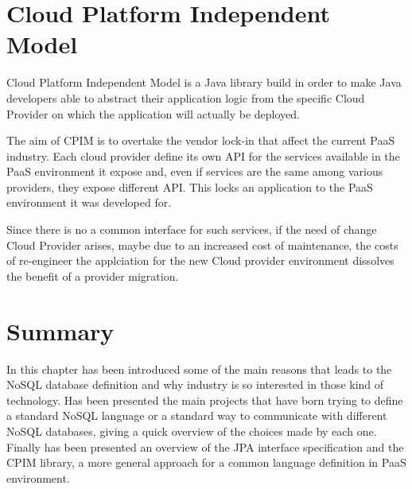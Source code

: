 \section{Cloud Platform Independent Model}
\label{sec:cpim}
Cloud Platform Independent Model \cite{thesis:cpim} is a Java library build in order to make Java developers able to abstract their application logic from the specific Cloud Provider on which the application will actually be deployed.

\newparagraph The aim of CPIM is to overtake the vendor lock-in that affect the current PaaS industry. Each cloud provider define its own API for the services available in the PaaS environment it expose and, even if services are the same among various providers, they expose different API. This locks an application to the PaaS environment it was developed for.

\noindent Since there is no a common interface for such services, if the need of change Cloud Provider arises, maybe due to an increased cost of maintenance, the costs of re-engineer the applciation for the new Cloud provider environment dissolves the benefit of a provider migration.

\section{Summary}
In this chapter has been introduced some of the main reasons that leads to the NoSQL database definition and why industry is so interested in those kind of technology. 
\noindent Has been presented the main projects that have born trying to define a standard NoSQL language or a standard way to communicate with different NoSQL databases, giving a quick overview of the choices made by each one. 
\noindent Finally has been presented an overview of the JPA interface specification and the CPIM library, a more general approach for a common language definition in PaaS environment.
